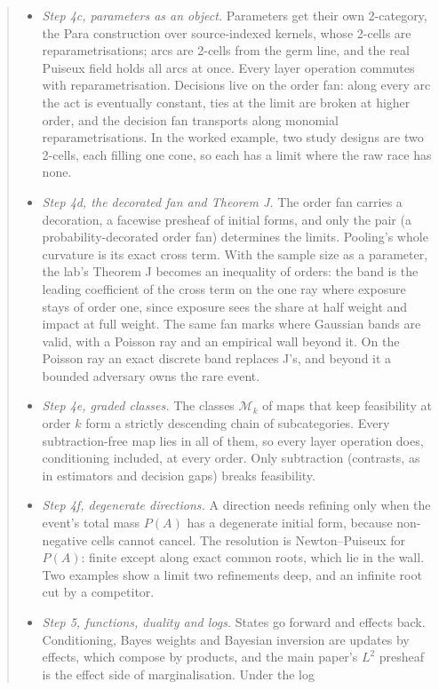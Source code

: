 \documentclass[11pt]{article}
\theoremstyle{definition}\newtheorem{definition}[theorem]{Definition}\newtheorem{remark}[theorem]{Remark}\newtheorem{example}[theorem]{Example}
\begin{document}
\begin{abstract}
\begin{itemize}
\item \emph{Step 4c, parameters as an object.} Parameters get their own 2-category, the Para construction over source-indexed kernels,
  whose 2-cells are reparametrisations; arcs are 2-cells from the germ line, and the real Puiseux field holds all arcs at once. Every
  layer operation commutes with reparametrisation. Decisions live on the order fan: along every arc the act is eventually constant,
  ties at the limit are broken at higher order, and the decision fan transports along monomial reparametrisations. In the worked
  example, two study designs are two 2-cells, each filling one cone, so each has a limit where the raw race has none.
\item \emph{Step 4d, the decorated fan and Theorem J.} The order fan carries a decoration, a facewise presheaf of initial forms, and only
  the pair (a probability-decorated order fan) determines the limits. Pooling's whole curvature is its exact cross term. With the sample size as a parameter, the lab's
  Theorem J becomes an inequality of orders: the band is the leading coefficient of the cross term on the one ray where exposure stays of
  order one, since exposure sees the share at half weight and impact at full weight. The same fan marks where Gaussian bands are valid,
  with a Poisson ray and an empirical wall beyond it. On the Poisson ray an exact discrete band replaces J's, and beyond it a bounded
  adversary owns the rare event.
\item \emph{Step 4e, graded classes.} The classes $\mathcal M_k$ of maps that keep feasibility at order $k$ form a strictly descending chain
  of subcategories. Every subtraction-free map lies in all of them, so every layer operation does, conditioning included, at every order.
  Only subtraction (contrasts, as in estimators and decision gaps) breaks feasibility.
\item \emph{Step 4f, degenerate directions.} A direction needs refining only when the event's total mass $P(A)$ has a degenerate initial
  form, because non-negative cells cannot cancel. The resolution is Newton--Puiseux for $P(A)$: finite except along exact common roots,
  which lie in the wall. Two examples show a limit two refinements deep, and an infinite root cut by a competitor.
\item \emph{Step 5, functions, duality and logs.} States go forward and effects back. Conditioning, Bayes weights and Bayesian inversion are
  updates by effects, which compose by products, and the main paper's $L^2$ presheaf is the effect side of marginalisation. Under the log

\end{itemize}
\end{abstract}
\end{document}
